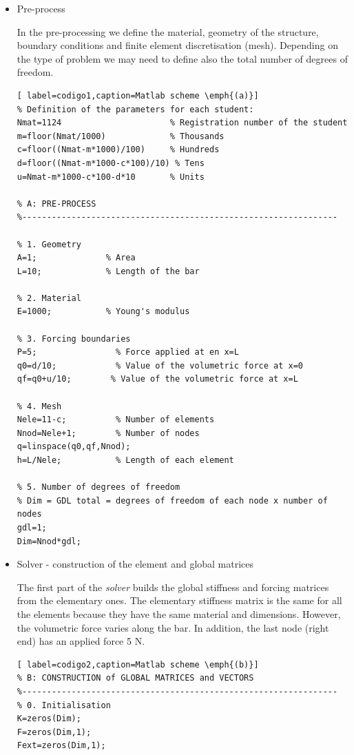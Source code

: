 \documentclass[spanish,a4paper,12pt]{article}
\begin{document}
\begin{itemize}
\item Pre-process

In the pre-processing we define the material, geometry of the structure, boundary conditions and finite element discretisation (mesh). Depending on the type of problem we may need to define also the total number of degrees of freedom.


\begin{lstlisting}[ label=codigo1,caption=Matlab scheme \emph{(a)}]
% Definition of the parameters for each student:
Nmat=1124                      % Registration number of the student 
m=floor(Nmat/1000)             % Thousands
c=floor((Nmat-m*1000)/100)     % Hundreds
d=floor((Nmat-m*1000-c*100)/10) % Tens
u=Nmat-m*1000-c*100-d*10       % Units

% A: PRE-PROCESS
%----------------------------------------------------------------

% 1. Geometry
A=1;              % Area
L=10;             % Length of the bar

% 2. Material
E=1000;           % Young's modulus

% 3. Forcing boundaries
P=5;                % Force applied at en x=L
q0=d/10;            % Value of the volumetric force at x=0
qf=q0+u/10;        % Value of the volumetric force at x=L

% 4. Mesh
Nele=11-c;          % Number of elements
Nnod=Nele+1;        % Number of nodes
q=linspace(q0,qf,Nnod);
h=L/Nele;           % Length of each element

% 5. Number of degrees of freedom
% Dim = GDL total = degrees of freedom of each node x number of nodes
gdl=1;
Dim=Nnod*gdl;

\end{lstlisting}

\item Solver - construction of the element and global matrices

The first part of the \textit{solver} builds the global stiffness and forcing matrices from the elementary ones. The elementary stiffness matrix is the same for all the elements because they have the same material and dimensions. However, the volumetric force varies along the bar. In addition, the last node (right end) has an applied force 5 N.

\begin{lstlisting}[ label=codigo2,caption=Matlab scheme \emph{(b)}]
% B: CONSTRUCTION of GLOBAL MATRICES and VECTORS 
%----------------------------------------------------------------
% 0. Initialisation
K=zeros(Dim);
F=zeros(Dim,1);
Fext=zeros(Dim,1); 


\end{lstlisting}
\end{itemize}
\end{document}
